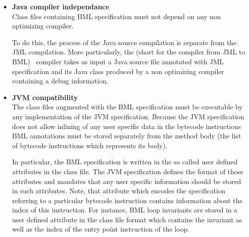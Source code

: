 \begin{itemize}

\item \textbf{Java compiler independance } \\
      Class files containing BML specification must not depend on 
      any non optimizing compiler. 
    
      To do this, the process of the Java source compilation is separate from the JML compilation. 
      More particularly, the \JMLtoBML (short for the compiler from JML to BML) \ compiler  takes as input a Java source file annotated with JML
      specification and its Java class produced by a non optimizing compiler containing a
      debug information.%
      

\item \textbf{JVM compatibility } \\
            The class files augmented with the BML specification must be executable by any
	    implementation of the JVM specification.
	     Because the JVM specification does not allow inlining of any user specific data in the bytecode instructions 
	    BML annotations must be stored separately from the method body (the list of bytecode instructions which represents its body).
	  
	    
	    In particular, the BML specification is written in the so
	    called user defined attributes in the class file.
	    The JVM specification defines the format of those attributes and mandates that any
	    user specific information should be stored in such attributes. 
	    Note, that attribute which encodes the specification  referring to a particular bytecode instruction contains
	    information about the index of this instruction. For instance,  BML loop invariants
	    are stored in a user defined attribute in the class file format which  contains the invariant
	    as well as the index of the entry point instruction of the loop.
	    

\end{itemize}
